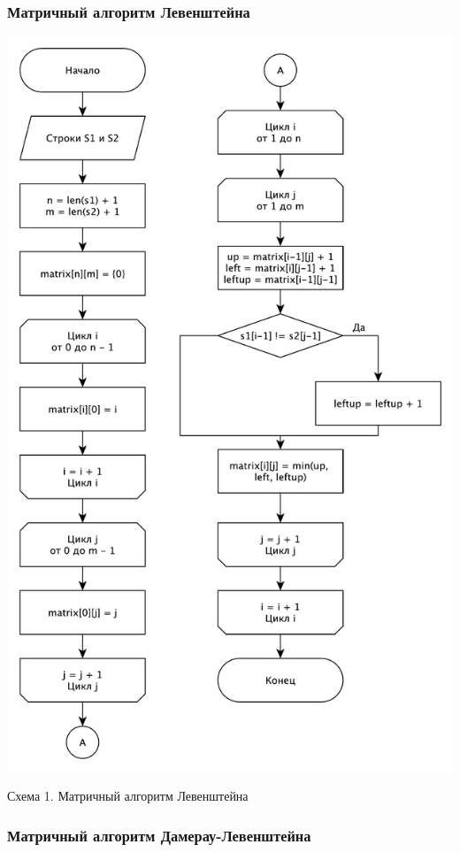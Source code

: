 \documentclass[a4paper,12pt]{article}
\begin{document}
\subsubsection{Матричный алгоритм Левенштейна}

\begin{center}
    \includegraphics[scale=0.23]{Lmatrix}

    Схема 1. Матричный алгоритм Левенштейна
\end{center}

\subsubsection{Матричный алгоритм Дамерау-Левенштейна}
\end{document}
